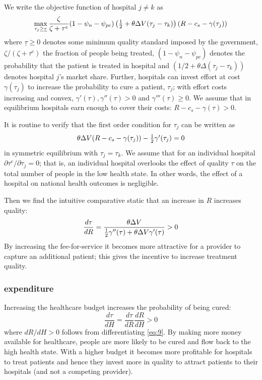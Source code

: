 \documentclass[a4paper,12pt]{article}
\begin{document}
We write the objective function of hospital \(j \neq k\) as
\begin{equation}
\label{eq:12}
\max_{\tau_j \geq \underline \tau} \frac{\zeta}{\zeta + \tau^e}(1-\psi_n-\psi_{pc})\left( \textstyle{1\over 2}  + \theta \Delta V (\tau_j - \tau_k) \right)(R-c_s - \gamma (\tau_j))
\end{equation}
where \(\underline \tau \geq 0\) denotes some minimum quality standard imposed by the government, \(\zeta/(\zeta+\tau^e)\) the fraction of people being treated, \((1-\psi_n - \psi_{pc})\) denotes the probability that the patient is treated in hospital and \((1/2 + \theta \Delta (\tau_j - \tau_k))\) denotes hospital \(j\)'s market share. Further, hospitals can invest effort at cost \(\gamma( \tau_j)\) to increase the probability to cure a patient, \(\tau_j\); with effort costs increasing and convex, \(\gamma'(\tau),\gamma''(\tau)>0\) and \(\gamma'''(\tau) \geq 0\). We assume that in equilibrium hospitals earn enough to cover their costs: \(R - c_s - \gamma(\tau) >0\).

It is routine to verify that the first order condition for \(\tau_j\) can be written as
\begin{equation}
\label{eq:13}
\theta \Delta V (R-c_s-\gamma(\tau_j))- \textstyle{1\over 2} \gamma'(\tau_{j})=0
\end{equation}
in symmetric equilibrium with \(\tau_j = \tau_k\). We assume that for an individual hospital \(\partial \tau^e/ \partial \tau_j =0\); that is, an individual hospital overlooks the effect of quality \(\tau\) on the total number of people in the low health state. In other words, the effect of a hospital on national health outcomes is negligible.

Then we find the intuitive comparative static that an increase in \(R\) increases quality:
\begin{equation}
\label{eq:20}
\frac{d\tau}{dR} = \frac{\theta \Delta V}{ \textstyle{1\over 2} \gamma''(\tau)+\theta \Delta V \gamma'(\tau) } > 0
\end{equation}
By increasing the fee-for-service  it becomes more attractive for a provider to capture an additional patient; this gives the incentive to increase treatment quality.


\subsubsection{expenditure}
\label{sec:org87d38aa}

Increasing the healthcare budget increases the probability of being cured:
\begin{equation}
\label{eq:16}
\frac{d\tau}{dH} = \frac{d\tau}{dR} \frac{dR}{dH} > 0
\end{equation}
where \(dR/dH > 0\) follows from differentiating \eqref{eq:9}. By making more money available for healthcare, people are more likely to be cured and flow back to the high health state. With a higher budget it becomes more profitable for hospitals to treat patients and hence they invest more in quality to attract patients to their hospitals (and not a competing provider).
\end{document}
